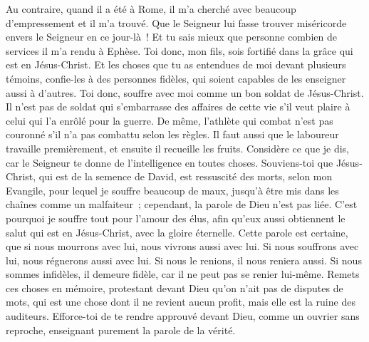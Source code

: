 \begin{multicols}{2}
Au contraire, quand il a été à Rome, il m'a cherché avec beaucoup d'empressement et il m'a trouvé.
Que le Seigneur lui fasse trouver miséricorde envers le Seigneur en ce jour-là~! Et tu sais mieux que personne combien  de services il m'a rendu à Ephèse.
\VerseOne{}Toi donc, mon fils, sois fortifié dans la grâce qui est en Jésus-Christ.
Et les choses que tu as entendues de moi devant plusieurs témoins, confie-les à des personnes fidèles, qui soient capables de les enseigner aussi à d'autres.
Toi donc, souffre avec moi comme un bon soldat de Jésus-Christ.
Il n'est pas de soldat qui s'embarrasse des affaires de cette vie s'il veut plaire à celui qui l'a enrôlé pour la guerre.
De même, l'athlète qui combat n'est pas couronné s'il n'a pas combattu selon les règles.
Il faut aussi que le laboureur travaille premièrement, et ensuite il recueille les fruits.
Considère ce que je dis, car le Seigneur te donne de l'intelligence en toutes choses.
Souviens-toi que Jésus-Christ, qui est de la semence de David, est ressuscité des morts, selon mon Evangile,
pour lequel je souffre beaucoup de maux, jusqu'à être mis dans les chaînes comme un malfaiteur~; cependant, la parole de Dieu n'est pas liée.
C'est pourquoi je souffre tout pour l'amour des élus, afin qu'eux aussi obtiennent le salut qui est en Jésus-Christ, avec la gloire éternelle.
Cette parole est certaine, que si nous mourrons avec lui, nous vivrons aussi avec lui.
Si nous souffrons avec lui, nous régnerons aussi avec lui. Si nous le renions, il nous reniera aussi.
Si nous sommes infidèles, il demeure fidèle, car il ne peut pas se renier lui-même.
Remets ces choses en mémoire, protestant devant Dieu qu'on n'ait pas de disputes de mots, qui est une chose dont il ne revient aucun profit, mais elle est la ruine des auditeurs.
Efforce-toi de te rendre approuvé devant Dieu, comme un ouvrier sans reproche, enseignant purement la parole de la vérité.

\end{multicols}

